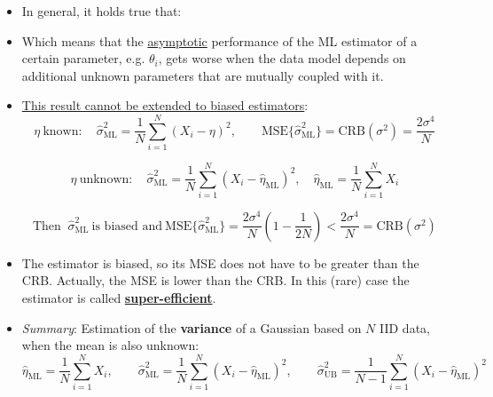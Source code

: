 \begin{itemize}
    $$
    \mathbf{I}(\boldsymbol{\theta})=\mathbf{I}^{T}(\boldsymbol{\theta})\quad\text{since}\quad I_{21}=I_{12}
    $$
    $$
\mathbf{I}^{-1}(\boldsymbol{\theta})
=\begin{bmatrix} I_{11} & I_{12}\\ I_{21} & I_{22}\end{bmatrix}^{-1}
=\frac{1}{\Delta}
\begin{bmatrix}
I_{22} & -I_{12}\\[4pt]
-I_{21} & I_{11}
\end{bmatrix},
\quad \Delta=I_{11}I_{22}-I_{21}I_{12}
$$ 

$$
\mathrm{CRB}(\theta_{1})
=\big[\mathbf{I}^{-1}(\boldsymbol{\theta})\big]_{1,1}
=\frac{I_{22}}{I_{11}I_{22}-I_{21}I_{12}}
=\frac{1}{\,I_{11}-\dfrac{(I_{21})^{2}}{I_{22}}\,}
\ge \frac{1}{I_{11}}
$$ 

$$
\mathrm{CRB}(\theta_{2})
=\big[\mathbf{I}^{-1}(\boldsymbol{\theta})\big]_{2,2}
=\frac{I_{11}}{I_{11}I_{22}-I_{21}I_{12}}
=\frac{1}{\,I_{22}-\dfrac{(I_{21})^{2}}{I_{11}}\,}
\ge \frac{1}{I_{22}}
$$ 

$$
\text{Equality iff } I_{21}=I_{12}=0
$$

    \item In general, it holds true that:

    \item Which means that the \underline{asymptotic} performance of the ML estimator of a certain parameter, e.g. \(\theta_i\), gets worse when the data model depends on additional unknown parameters that are mutually coupled with it.

    \item \underline{This result cannot be extended to biased estimators}:
    $$
\eta\ \text{known}:\quad
\hat{\sigma}^{2}_{\mathrm{ML}}
=\frac{1}{N}\sum_{i=1}^{N}(X_{i}-\eta)^{2},
\qquad
\mathrm{MSE}\{\hat{\sigma}^{2}_{\mathrm{ML}}\}
=\mathrm{CRB}(\sigma^{2})
=\frac{2\sigma^{4}}{N}
$$ 

$$
\eta\ \text{unknown}:\quad
\hat{\sigma}^{2}_{\mathrm{ML}}
=\frac{1}{N}\sum_{i=1}^{N}(X_{i}-\hat{\eta}_{\mathrm{ML}})^{2},
\quad
\hat{\eta}_{\mathrm{ML}}=\frac{1}{N}\sum_{i=1}^{N}X_{i}
$$ 

$$
\text{Then }\ \hat{\sigma}^{2}_{\mathrm{ML}}\ \text{is biased and}\ 
\mathrm{MSE}\{\hat{\sigma}^{2}_{\mathrm{ML}}\}
=\frac{2\sigma^{4}}{N}\!\left(1-\frac{1}{2N}\right)
<\frac{2\sigma^{4}}{N}
=\mathrm{CRB}(\sigma^{2})
$$
    \item The estimator is biased, so its MSE does not have to be greater than the CRB. Actually, the MSE is lower than the CRB. In this (rare) case the estimator is called \underline{\textbf{super-efficient}}.
    \item \textit{Summary}: Estimation of the \textbf{variance} of a Gaussian based on \(N\) IID data, when the mean is also unknown:
    $$
\hat{\eta}_{\mathrm{ML}}=\frac{1}{N}\sum_{i=1}^{N}X_{i},\qquad
\hat{\sigma}^{2}_{\mathrm{ML}}=\frac{1}{N}\sum_{i=1}^{N}(X_{i}-\hat{\eta}_{\mathrm{ML}})^{2},\qquad
\hat{\sigma}^{2}_{\mathrm{UB}}=\frac{1}{N-1}\sum_{i=1}^{N}(X_{i}-\hat{\eta}_{\mathrm{ML}})^{2}
$$ 


\end{itemize}
